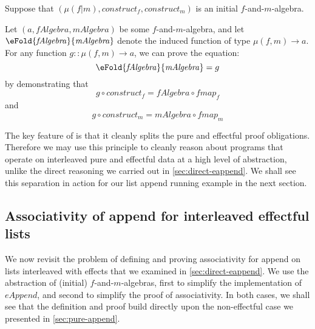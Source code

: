 \begin{proofprinciple}
  \label{pp:initial-f-m-alg}
  Suppose that $(\mu(f|m), \mathit{construct}_f,
  \mathit{construct}_m)$ is an initial $f$-and-$m$-algebra.

  Let $(a, \mathit{fAlgebra}, \mathit{mAlgebra})$ be some
  $f$-and-$m$-algebra, and let
  $\eFold{\mathit{fAlgebra}}{\mathit{mAlgebra}}$ denote the induced
  function of type $\mu(f,m) \to a$. For any function $g :: \mu(f,m)
  \to a$, we can prove the equation:
  \begin{displaymath}
    \eFold{\mathit{fAlgebra}}{\mathit{mAlgebra}} = g
  \end{displaymath}
  by demonstrating that
  \begin{displaymath}
    g \circ \mathit{construct}_f = \mathit{fAlgebra} \circ \mathit{fmap}_f
  \end{displaymath}
  and
  \begin{displaymath}
    g \circ \mathit{construct}_m = \mathit{mAlgebra} \circ \mathit{fmap}_m
  \end{displaymath}
\end{proofprinciple}

The key feature of  is that it
cleanly splits the pure and effectful proof obligations. Therefore we
may use this principle to cleanly reason about programs that operate
on interleaved pure and effectful data at a high level of abstraction,
unlike the direct reasoning we carried out in
\autoref{sec:direct-eappend}. We shall see this separation in action
for our list append running example in the next section.

\subsection{Associativity of append for interleaved effectful lists}
\label{sec:f-and-m-append}

We now revisit the problem of defining and proving associativity for
append on lists interleaved with effects that we examined in
\autoref{sec:direct-eappend}. We use the abstraction of (initial)
$f$-and-$m$-algebras, first to simplify the implementation of
$\mathit{eAppend}$, and second to simplify the proof of
associativity. In both cases, we shall see that the definition and
proof build directly upon the non-effectful case we presented in
\autoref{sec:pure-append}.

